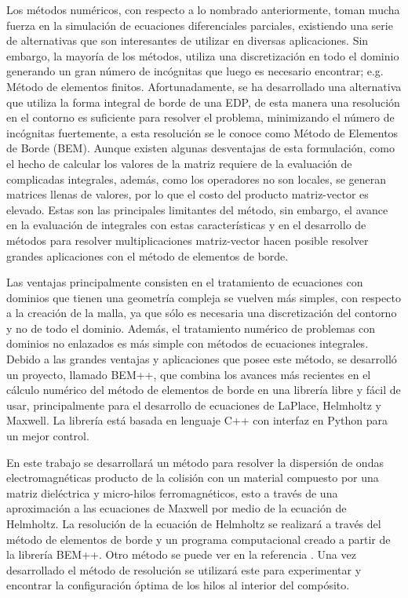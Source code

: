\documentclass[12pt,letterpaper]{article}
\numberwithin{equation}{section}
\begin{document}
Los métodos numéricos, con respecto a lo nombrado anteriormente, toman mucha fuerza en la simulación de ecuaciones diferenciales parciales, existiendo una serie de alternativas que son interesantes de utilizar en diversas aplicaciones. Sin embargo, la mayoría de los métodos, utiliza una discretización en todo el dominio generando un gran número de incógnitas que
luego es necesario encontrar; e.g. Método de elementos finitos. Afortunadamente, se ha desarrollado una alternativa que utiliza la forma integral de borde de una EDP, de esta manera una resolución en el contorno es suficiente para resolver el problema, minimizando el número de incógnitas fuertemente, a esta resolución se le conoce como Método de Elementos de Borde
(BEM). Aunque existen algunas desventajas de esta formulación, como el hecho de calcular los valores de la matriz requiere de la evaluación de complicadas integrales, además, como los operadores no son locales, se generan matrices llenas de valores, por lo que el costo del producto matriz-vector es elevado. Estas son las principales limitantes del método, sin embargo, el avance en la evaluación de integrales con estas características y en el desarrollo de métodos para resolver multiplicaciones matriz-vector hacen posible resolver grandes aplicaciones con el método de elementos de borde. 

Las ventajas principalmente consisten en el tratamiento de ecuaciones con dominios que tienen una geometría compleja se vuelven más simples, con respecto a la creación de la malla, ya que sólo es necesaria una
discretización del contorno y no de todo el dominio. Además, el tratamiento numérico de problemas con dominios no enlazados es más simple con
métodos de ecuaciones integrales. Debido a las grandes ventajas y aplicaciones que posee este método, se desarrolló un proyecto, llamado BEM++, que combina los avances más recientes en el cálculo numérico del método de elementos de borde en una librería libre y fácil de usar, principalmente para el desarrollo de ecuaciones de LaPlace, Helmholtz y Maxwell. La librería está basada en lenguaje C++ con interfaz en Python para un mejor control.

En este trabajo se desarrollará un método para resolver la dispersión de ondas electromagnéticas producto de la colisión con un material compuesto por una matriz dieléctrica y micro-hilos ferromagnéticos, esto a través de una aproximación a las ecuaciones de Maxwell por medio de la ecuación de Helmholtz. La resolución de la ecuación de Helmholtz se realizará a través del método de elementos de borde y un programa computacional creado a partir de la librería BEM++. Otro método se puede ver en la referencia \cite{Wire_theory_2}. Una vez desarrollado el método de resolución se utilizará este para experimentar y encontrar la configuración óptima de los hilos al interior del compósito. 
\end{document}
